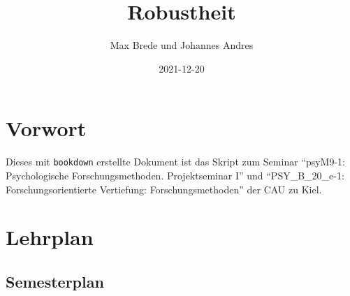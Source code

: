 \documentclass[
]{book}
\title{Robustheit}
\author{Max Brede und Johannes Andres}
\date{2021-12-20}
\begin{document}
\maketitle

{
\setcounter{tocdepth}{1}
\tableofcontents
}
\hypertarget{vorwort}{%
\chapter{Vorwort}\label{vorwort}}

Dieses mit \texttt{bookdown} erstellte Dokument ist das Skript zum Seminar ``psyM9-1: Psychologische Forschungsmethoden. Projektseminar I'' und ``PSY\_B\_20\_e-1: Forschungsorientierte Vertiefung: Forschungsmethoden'' der CAU zu Kiel.

\hypertarget{lehrplan}{%
\chapter{Lehrplan}\label{lehrplan}}

\hypertarget{semesterplan}{%
\section{Semesterplan}\label{semesterplan}}

\scriptsize
\end{document}
